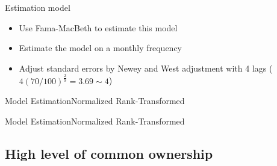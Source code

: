 \documentclass[handout]{beamer}
\begin{document}
	
	
	\begin{frame}{Estimation model}\label{Estimation}
		\begin{itemize}
			\item Use Fama-MacBeth to estimate this model
			
			
			\item Estimate the model on a monthly frequency 
			\item Adjust standard errors by Newey and West adjustment with 4 lags ($ 4(70/100)^{\frac{2}{9}} = 3.69 \sim 4 $)
		\end{itemize}
				\hfill
				\hyperlink{Methood}{}
	\end{frame}
	
	\begin{frame}{Model Estimation}{Normalized Rank-Transformed}
			\label{mresult2part1} 
			\begin{table}[htbp]
				\centering
				\resizebox{1\textwidth}{!}{
					
				}
			\end{table}
			
			
		\end{frame}
	\begin{frame}{Model Estimation}{Normalized Rank-Transformed}
			\label{mresult2part2} 
			\begin{table}[htbp]
				\centering
				\resizebox{1\textwidth}{!}{
					
				}
			\end{table}
			
			
		\end{frame}
	
	
	\subsection{High level of common ownership}
	
%		
%		
%		
%		
%		
%		
%		
	
\end{document}
